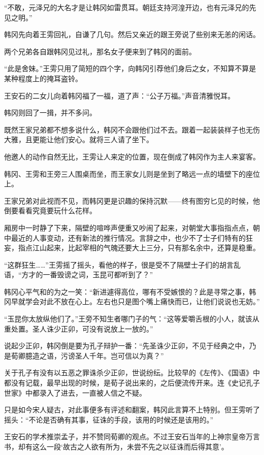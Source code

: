 “不敢，元泽兄的大名才是让韩冈如雷贯耳。朝廷支持河湟开边，也有元泽兄的先见之明。”

韩冈先向着王雱回礼，自谦了几句。然后又亲近的跟王旁说了些别来无恙的闲话。

两个兄弟各自跟韩冈见过礼，那名女子便来到了韩冈的面前。

“此是舍妹。”王雱只用了简短的四个字，向韩冈引荐他们身后之女，不知算不算是某种程度上的掩耳盗铃。

王安石的二女儿向着韩冈福了一福，道了声：“公子万福。”声音清雅悦耳。

韩冈则回了一揖，并不多问。

既然王家兄弟都不想多说什么，韩冈不会跟他们过不去。跟着一起装装样子也无伤大雅，且更能让他们安心。就将三人请了坐下。

他邀人的动作自然无比，王雱让人来定的位置，现在倒成了韩冈作为主人来宴客。

韩冈、王雱和王旁三人围桌而坐，而王家女儿则是坐到了略远一点的墙壁下的座位上。

王家兄弟对此视而不见，而韩冈更是识趣的保持沉默——终有图穷匕见的时候，他倒要看看究竟要玩什么花样。

厢房中一时静了下来，隔壁的喧哗声便重又吵闹了起来，对朝堂大事指指点点，朝中最近的人事变动，还有新法的推行情况。言辞之中，也少不了士子们特有的狂妄，指点江山起来，比起宰相的气魄还要大上三分，只有那名余中，还算是稳重。

“这群狂生……”王雱摇了摇头，看他的样子，很是受不了隔壁士子们的胡言乱语，“方才的一番毁谤之词，玉昆可都听到了？”

韩冈心平气和的为之一笑：“新进遽得高位，哪有不受嫉恨的？此是寻常之事，韩冈早就学会对此不放在心上。左右也只是图个嘴上痛快而已，让他们说说也无妨。”

“玉昆你太放纵他们了。”王旁不知生者哪门子的气：“这等爱嚼舌根的小人，就该从重处置。圣人诛少正卯，可没有说放上一放的。”

说起少正卯，韩冈倒是要为孔子辩护一番：“先圣诛少正卯，不见于经典之中，乃是荀卿臆造之语，污谤圣人千年。岂可信以为真？”

关于孔子有没有以五恶之罪诛杀少正卯，世说纷纭。比较早的《左传》、《国语》中都没有记载，最早出现的时候，是荀子说出来的，之后便流传开来。连《史记孔子世家》中都录入了进去，一直被人信之不疑。

只是如今宋人疑古，对此事便多有评述和翻案，韩冈此言算不上特别。但王雱听了摇头：“不论是否确有其事，征诛的手段，该用的时候还是该用的。”

王安石的学术推崇孟子，并不赞同荀卿的观点。不过王安石当年的上神宗皇帝万言书，却有这么一段‘故古之人欲有所为，未尝不先之以征诛而后得其意’。

